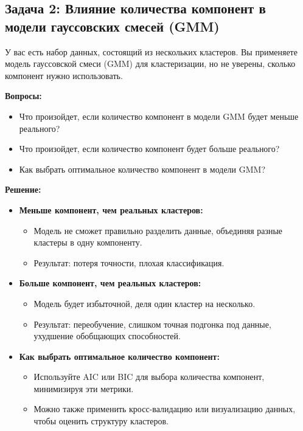 \subsection{Задача 2: Влияние количества компонент в модели гауссовских смесей (GMM)}

У вас есть набор данных, состоящий из нескольких кластеров. Вы применяете модель гауссовской смеси (GMM) для кластеризации, но не уверены, сколько компонент нужно использовать.

\noindent\textbf{Вопросы:}
\begin{itemize}
    \item Что произойдет, если количество компонент в модели GMM будет меньше реального?
    \item Что произойдет, если количество компонент будет больше реального?
    \item Как выбрать оптимальное количество компонент в модели GMM?
\end{itemize}

\noindent\textbf{Решение:}
\begin{itemize}
    \item \textbf{Меньше компонент, чем реальных кластеров:}
    \begin{itemize}
        \item Модель не сможет правильно разделить данные, объединяя разные кластеры в одну компоненту.
        \item Результат: потеря точности, плохая классификация.
    \end{itemize}

    \item \textbf{Больше компонент, чем реальных кластеров:}
    \begin{itemize}
        \item Модель будет избыточной, деля один кластер на несколько.
        \item Результат: переобучение, слишком точная подгонка под данные, ухудшение обобщающих способностей.
    \end{itemize}

    \item \textbf{Как выбрать оптимальное количество компонент:}
    \begin{itemize}
        \item Используйте AIC или BIC для выбора количества компонент, минимизируя эти метрики.
        \item Можно также применить кросс-валидацию или визуализацию данных, чтобы оценить структуру кластеров.
    \end{itemize}
\end{itemize}

